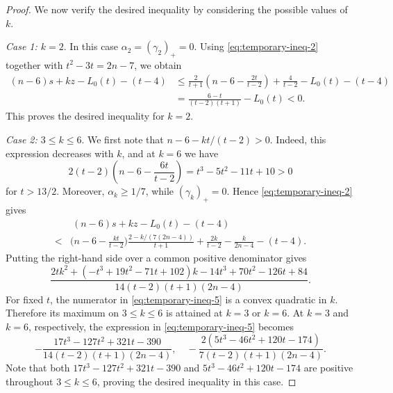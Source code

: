 \documentclass[11pt]{article}
\theoremstyle{plain}
\theoremstyle{definition}
\numberwithin{equation}{section}
\begin{document}
\begin{proof}
We now verify the desired inequality by considering the possible values of $k$.
\smallskip

\noindent\emph{Case 1: $k=2$}. In this case $\alpha_2 = (\gamma_2)_+ = 0$. 
Using \eqref{eq:temporary-ineq-2} together with $t^2-3t=2n-7$, we obtain
\begin{align*}
(n-6)s + kz - L_0(t) - (t-4)
& \leq\frac{2}{t+1}\left(n-6-\frac{2t}{t-2}\right) + \frac{4}{t-2}
 -L_0(t)-(t-4) \\
& = \frac{6-t}{(t-2)(t+1)}-L_0(t)<0.
\end{align*}
This proves the desired inequality for $k=2$.

\smallskip
\noindent\emph{Case 2: $3\leq k\leq 6$}.
We first note that $n - 6 - kt/(t-2) > 0$. Indeed, this expression decreases with $k$, and at $k=6$ we have
\begin{equation}\label{eq:temporary-ineq-4}
2(t-2)\left(n-6-\frac{6t}{t-2}\right)
= t^3 - 5t^2 - 11t + 10 > 0
\end{equation}
for $t>13/2$. Moreover, $\alpha_k\ge1/7$, while $(\gamma_k)_+ = 0$. Hence \eqref{eq:temporary-ineq-2} gives
\begin{align*}
& ~ (n-6)s + kz - L_0(t) - (t-4) \\
< & \Big(n - 6 - \frac{kt}{t-2}\Big)
\frac{2 - k/(7(2n-4))}{t+1} + \frac{2k}{t-2} - \frac{k}{2n-4} - (t-4).
\end{align*}
Putting the right-hand side over a common positive denominator gives
\begin{equation}\label{eq:temporary-ineq-5}
\frac{2tk^2+(-t^3+19t^2-71t+102)k -14t^3+70t^2-126t+84}{14(t-2)(t+1)(2n-4)}.
\end{equation}
For fixed $t$, the numerator in \eqref{eq:temporary-ineq-5} is a convex quadratic in
$k$. Therefore its maximum on $3\leq k\leq 6$ is attained at
$k=3$ or $k=6$. At $k=3$ and $k=6$, respectively, the expression
in \eqref{eq:temporary-ineq-5} becomes
\[
-\frac{17t^3-127t^2+321t-390}{14(t-2)(t+1)(2n-4)}, \quad
-\frac{2(5t^3-46t^2+120t-174)}{7(t-2)(t+1)(2n-4)}.
\]
Note that both $17t^3-127t^2+321t-390$ and $5t^3-46t^2+120t-174$ are positive throughout
$3\leq k\leq 6$, proving the desired inequality in this case.


\end{proof}
\end{document}
